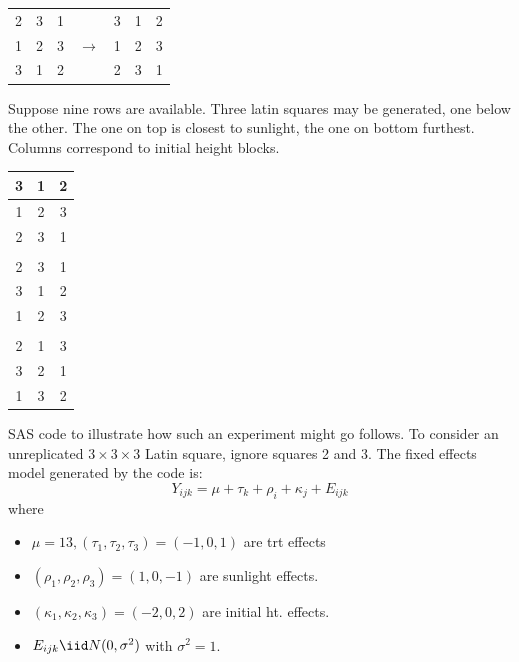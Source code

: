 \begin{center}
\begin{tabular}{|c|c|c|c|c|c|c|} \cline{1-3} \cline{5-7}
2 & 3 & 1 & & 
3 & 1 & 2 \\ \cline{1-3} \cline{5-7}
1 & 2 & 3 & $\longrightarrow$ & 
1 & 2 & 3 \\ \cline{1-3} \cline{5-7}
3 & 1 & 2 & & 
2 & 3 & 1 \\ \cline{1-3} \cline{5-7}
\end{tabular}
\end{center}
Suppose nine rows are available.  Three latin squares may
be generated, one below the other.  The one on top is closest to
sunlight, the one on bottom furthest.  Columns correspond to initial
height blocks.
\begin{center}
\begin{tabular}{|c|c|c|} \hline
3 & 1 & 2 \\ \hline
1 & 2 & 3 \\ \hline
2 & 3 & 1 \\ \hline
\multicolumn{3}{c}{}\\ \hline
2 & 3 & 1 \\ \hline
3 & 1 & 2 \\ \hline
1 & 2 & 3 \\ \hline
\multicolumn{3}{c}{}\\ \hline
2 & 1 & 3 \\ \hline
3 & 2 & 1 \\ \hline
1 & 3 & 2 \\ \hline
\end{tabular}
\end{center}
\newpage
\noindent
SAS code to illustrate how such an experiment might go 
follows.  
To consider an unreplicated $3\times 3 \times 3$
Latin square, ignore squares 2 and 3.
The fixed effects model %
generated by the code is: 
$$ Y_{ijk} = \mu + \tau_k + \rho_i + \kappa_j + E_{ijk}$$
where 
\begin{itemize}
\item $\mu=13, (\tau_1,\tau_2,\tau_3)=(-1,0,1)$ are trt effects
\item $(\rho_1,\rho_2,\rho_3) = (1,0,-1)$ are sunlight effects.
\item $(\kappa_1,\kappa_2,\kappa_3) = (-2,0,2)$ are initial ht. effects.
\item $E_{ijk} \iid N(0,\sigma^2)$ with $\sigma^2=1$.
\end{itemize}
